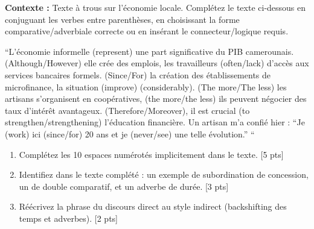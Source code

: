 \documentclass[11pt]{article}
\begin{document}
\begin{exercice}
\textbf{Contexte :} Texte à trous sur l'économie locale. Complétez le texte ci-dessous en conjuguant les verbes entre parenthèses, en choisissant la forme comparative/adverbiale correcte ou en insérant le connecteur/logique requis.

``L'économie informelle \underline{\hspace{3cm}} (represent) une part significative du PIB camerounais. \underline{\hspace{2cm}} (Although/However) elle crée des emplois, les travailleurs \underline{\hspace{2cm}} (often/lack) d'accès aux services bancaires formels. \underline{\hspace{2cm}} (Since/For) la création des établissements de microfinance, la situation \underline{\hspace{3cm}} (improve) \underline{\hspace{2cm}} (considerably). \underline{\hspace{2cm}} (The more/The less) les artisans s'organisent en coopératives, \underline{\hspace{2cm}} (the more/the less) ils peuvent négocier des taux d'intérêt avantageux. \underline{\hspace{2cm}} (Therefore/Moreover), il est crucial \underline{\hspace{2cm}} (to strengthen/strengthening) l'éducation financière. Un artisan m'a confié hier : ``Je \underline{\hspace{2cm}} (work) ici \underline{\hspace{2cm}} (since/for) 20 ans et je \underline{\hspace{2cm}} (never/see) une telle évolution.'' ``
\begin{enumerate}
    \item Complétez les 10 espaces numérotés implicitement dans le texte. [5 pts]
    \item Identifiez dans le texte complété : un exemple de subordination de concession, un de double comparatif, et un adverbe de durée. [3 pts]
    \item Réécrivez la phrase du discours direct au style indirect (backshifting des temps et adverbes). [2 pts]
\end{enumerate}
\end{exercice}
\end{document}
